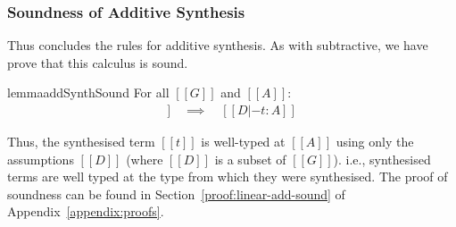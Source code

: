   \subsubsection{Soundness of Additive Synthesis}
  Thus concludes the rules for additive synthesis. As with subtractive, we
  have prove that this calculus is sound.
  \begin{restatable}{lemma}{addSynthSound}
\label{lemma:addSynthSound} For all $[[ G ]]$ and $[[ A ]]$:
%
\begin{align*}
[[ G |- A =>+ t ; D ]] \quad \implies \quad [[ D |- t : A ]]
\end{align*}
\end{restatable}
Thus, the synthesised term $[[ t ]]$ is well-typed
at $[[ A ]]$ using only the assumptions $[[ D ]]$ (where $[[D]]$ is a
subset of $[[G]]$).
i.e., synthesised terms are well typed at the type from which they
were synthesised.
The proof of soundness can be found in Section~\ref{proof:linear-add-sound} of
Appendix~\ref{appendix:proofs}.

